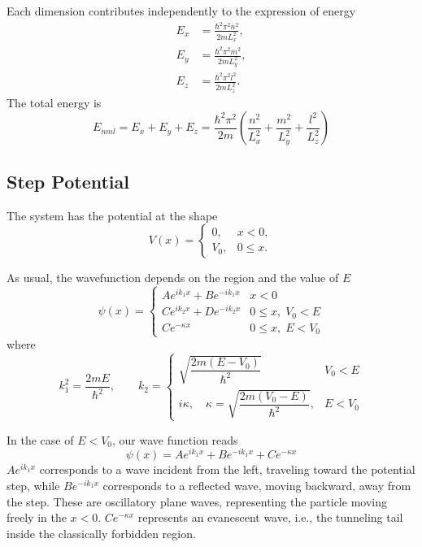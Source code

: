 \documentclass[../../../main.tex]{subfiles}
\begin{document}
Each dimension contributes independently to the expression of energy
\begin{align*}
    E_x & = \frac{\hbar^2 \pi^2 n^2}{2 m L_x^2}, \\
    E_y & = \frac{\hbar^2 \pi^2 m^2}{2 m L_y^2}, \\
    E_z & = \frac{\hbar^2 \pi^2 l^2}{2 m L_z^2}.
\end{align*}
The total energy is
\begin{equation*}
    E_{nml} = E_x + E_y + E_z = \frac{\hbar^2 \pi^2}{2 m} \left( \frac{n^2}{L_x^2} + \frac{m^2}{L_y^2} + \frac{l^2}{L_z^2} \right)
\end{equation*}

\subsection{Step Potential}
The system has the potential at the shape
\begin{equation*}
    V(x) =
    \begin{cases}
        0,   & x < 0,   \\
        V_0, & 0\leq x.
    \end{cases}
\end{equation*}

As usual, the wavefunction depends on the region and the value of $E$
\begin{equation*}
    \psi(x)=
    \begin{cases}
        A e^{i k_1 x} + B e^{-i k_1 x} & x <0                \\
        C e^{i k_2 x} + D e^{-i k_2 x} & 0 \leq x,\; V_0 < E \\
        C e^{-\kappa x}                & 0 \leq x,\;E < V_0
    \end{cases}
\end{equation*}
where
\begin{equation*}
    k_1^2 =\frac{2 m E}{\hbar^2}    ,
    \qquad
    k_2 =
    \begin{cases}
        \sqrt{\dfrac{2 m (E - V_0)}{\hbar^2}}                           & V_0<E   \\
        i \kappa, \quad \kappa = \sqrt{\dfrac{2 m (V_0 - E)}{\hbar^2}}, & E < V_0
    \end{cases}
\end{equation*}

In the case of $E<V_0$, our wave function reads
\begin{equation*}
    \psi(x)=Ae^{ik_1x}+Be^{-ik_1x}+Ce^{-\kappa x}
\end{equation*}
$Ae^{ik_1x}$ corresponds to a wave incident from the left, traveling toward the potential step, while $Be^{-ik_1x}$ corresponds to a reflected wave, moving backward, away from the step.
These are oscillatory plane waves, representing the particle moving freely in the $x<0$.
$Ce^{-\kappa x}$ represents an evanescent wave, i.e., the tunneling tail inside the classically forbidden region.
\end{document}
